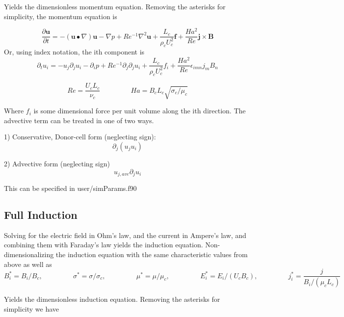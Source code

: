 \documentclass[11pt]{article}
\newcommand{\eqtab}{\;\;\;\;\;\;\;\;\;\;\;\;\;\;\;\;}
\begin{document}
Yields the dimensionless momentum equation. Removing the asterisks for simplicity, the momentum equation is

\begin{equation} \label{eq:momentum}
\frac{\partial \pmb{u}}{\partial t} = 
- ( \pmb{u} \bullet \nabla ) \pmb{u}
- \nabla p
+ Re^{-1} \nabla^2 \pmb{u} 
+ \frac{L_c}{\rho_c U_c^2} \pmb{f}
+ \frac{Ha^2}{Re} \pmb{j} \times \pmb{B}
\end{equation}
Or, using index notation, the ith component is
\begin{equation} \label{eq:momentumIndex}
\partial_t u_i = 
- u_j \partial_j u_i 
- \partial_i p 
+ Re^{-1} \partial_j \partial_j u_i 
+ \frac{L_c}{\rho_c U_c^2} f_i
+ \frac{Ha^2}{Re} \epsilon_{imn} j_m B_n
\end{equation}

\begin{equation} \label{eq:Re}
Re = \frac{U_c L_c}{\nu_c}
\eqtab
Ha = B_c L_c \sqrt{\sigma_c/\mu_c}
\end{equation}

Where $f_i$ is some dimensional force per unit volume along the ith direction. The advective term can be treated in one of two ways.

1) Conservative, Donor-cell form (neglecting sign):
\begin{equation} \label{eq:Donor-Cell}
\partial_j (u_j u_i)
\end{equation}

2) Advective form (neglecting sign)
\begin{equation} \label{eq:advectiveUForm}
u_{j,ave} \partial_j u_i
\end{equation}

This can be specified in user/simParams.f90

\subsection{Full Induction}
Solving for the electric field in Ohm's law, and the current in Ampere's law, and combining them with Faraday's law yields the induction equation. Non-dimensionalizing the induction equation with the same characteristic values from above as well as
\begin{equation*}
B_i^* = B_i/B_c  ,\eqtab
\sigma^* = \sigma/\sigma_c ,\eqtab
\mu^* = \mu/\mu_c ,\eqtab
E_i^* = E_i/(U_c B_c) ,\eqtab
j_i^* = \frac{j}{B_i/(\mu_c L_c)}
\end{equation*}

Yields the dimensionless induction equation. Removing the asterisks for simplicity we have
\end{document}
